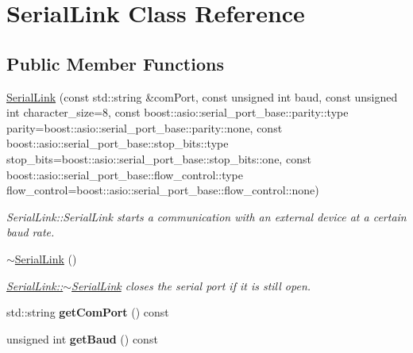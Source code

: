 \hypertarget{class_serial_link}{}\section{Serial\+Link Class Reference}
\label{class_serial_link}
\subsection*{Public Member Functions}
\begin{DoxyCompactItemize}
\item 
\mbox{\hyperlink{class_serial_link_a96aca1c125f24688b57b6fde3fbc4f6d}{Serial\+Link}} (const std\+::string \&com\+Port, const unsigned int baud, const unsigned int character\+\_\+size=8, const boost\+::asio\+::serial\+\_\+port\+\_\+base\+::parity\+::type parity=boost\+::asio\+::serial\+\_\+port\+\_\+base\+::parity\+::none, const boost\+::asio\+::serial\+\_\+port\+\_\+base\+::stop\+\_\+bits\+::type stop\+\_\+bits=boost\+::asio\+::serial\+\_\+port\+\_\+base\+::stop\+\_\+bits\+::one, const boost\+::asio\+::serial\+\_\+port\+\_\+base\+::flow\+\_\+control\+::type flow\+\_\+control=boost\+::asio\+::serial\+\_\+port\+\_\+base\+::flow\+\_\+control\+::none)
\begin{DoxyCompactList}\small\item\em Serial\+Link\+::\+Serial\+Link starts a communication with an external device at a certain baud rate. \end{DoxyCompactList}\item 
\mbox{\label{class_serial_link_af9a3c0d7518e7f554f49c198411e1521}} 
\mbox{\hyperlink{class_serial_link_af9a3c0d7518e7f554f49c198411e1521}{$\sim$\+Serial\+Link}} ()
\begin{DoxyCompactList}\small\item\em \mbox{\hyperlink{class_serial_link_af9a3c0d7518e7f554f49c198411e1521}{Serial\+Link\+::$\sim$\+Serial\+Link}} closes the serial port if it is still open. \end{DoxyCompactList}\item 
\mbox{\label{class_serial_link_a521d8f0f8f60080d99dc81cc5d45d08e}} 
std\+::string {\bfseries get\+Com\+Port} () const
\item 
\mbox{\label{class_serial_link_a86e302428112bd501af24c9d47c95587}} 
unsigned int {\bfseries get\+Baud} () const

\end{DoxyCompactItemize}
